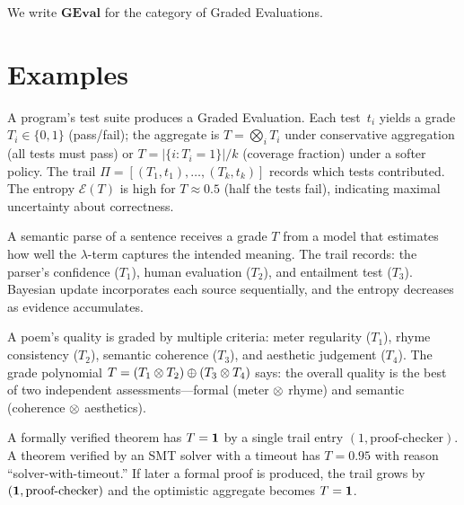 We write $\mathbf{GEval}$ for the category of Graded Evaluations.

\section{Examples}

\begin{example}
\label{ex:test-coverage}
A program's test suite produces a Graded Evaluation.  Each test~$t_i$
yields a grade $T_i \in \{0, 1\}$ (pass/fail); the aggregate is
$T = \bigotimes_i T_i$ under conservative aggregation (all tests must
pass) or $T = |\{i : T_i = 1\}| / k$ (coverage fraction) under a
softer policy.  The trail
$\Pi = [(T_1, t_1), \ldots, (T_k, t_k)]$ records which tests
contributed.  The entropy $\mathcal{E}(T)$ is high for $T \approx
0.5$ (half the tests fail), indicating maximal uncertainty about
correctness.
\end{example}

\begin{example}
\label{ex:semantic-adequacy}
A semantic parse of a sentence receives a grade $T$ from a model that
estimates how well the $\lambda$-term captures the intended meaning.
The trail records: the parser's confidence ($T_1$), human evaluation
($T_2$), and entailment test ($T_3$).  Bayesian update incorporates
each source sequentially, and the entropy decreases as evidence
accumulates.
\end{example}

\begin{example}
\label{ex:poetic-quality}
A poem's quality is graded by multiple criteria: meter regularity
($T_1$), rhyme consistency ($T_2$), semantic coherence ($T_3$), and
aesthetic judgement ($T_4$).  The grade polynomial
$T = (T_1 \otimes T_2) \oplus (T_3 \otimes T_4)$ says: the overall quality
is the best of two independent assessments---formal (meter $\otimes$
rhyme) and semantic (coherence $\otimes$ aesthetics).
\end{example}

\begin{example}
\label{ex:proof-confidence}
A formally verified theorem has $T = \mathbf{1}$ by a single trail entry
$(1, \text{proof-checker})$.  A theorem verified by an SMT solver with
a timeout has $T = 0.95$ with reason ``solver-with-timeout.''  If later
a formal proof is produced, the trail grows by $(\mathbf{1},
\text{proof-checker})$ and the optimistic aggregate becomes $T = \mathbf{1}$.
\end{example}

